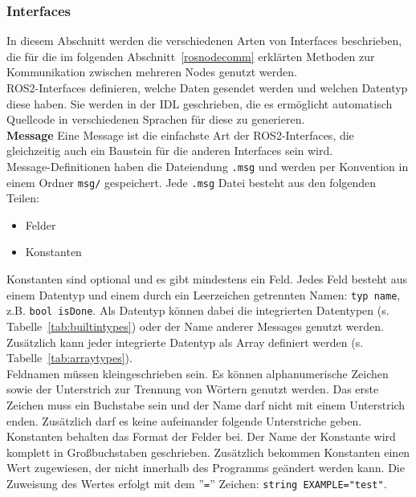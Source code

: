 \subsubsection{Interfaces}
In diesem Abschnitt werden die verschiedenen Arten von Interfaces beschrieben, die für die im folgenden Abschnitt~\ref{rosnodecomm} erklärten Methoden zur Kommunikation zwischen mehreren Nodes genutzt werden.\\
\ac{ROS2}-Interfaces definieren, welche Daten gesendet werden und welchen Datentyp diese haben.
Sie werden in der \ac{IDL} geschrieben, die es ermöglicht automatisch Quellcode in verschiedenen Sprachen für diese zu generieren.\\

\textbf{Message} Eine Message ist die einfachste Art der \ac{ROS2}-Interfaces, die gleichzeitig auch ein Baustein für die anderen Interfaces sein wird.\\
Message-Definitionen haben die Dateiendung \verb|.msg| und werden per Konvention in einem Ordner \verb|msg/| gespeichert.
Jede \verb|.msg| Datei besteht aus den folgenden Teilen:
\begin{itemize}
\item Felder
\item Konstanten
\end{itemize}
Konstanten sind optional und es gibt mindestens ein Feld.
Jedes Feld besteht aus einem Datentyp und einem durch ein Leerzeichen getrennten Namen: \verb|typ name|, z.B. \verb|bool isDone|.
Als Datentyp können dabei die integrierten Datentypen (s. Tabelle~\ref{tab:builtintypes}) oder der Name anderer Messages genutzt werden.
Zusätzlich kann jeder integrierte Datentyp als Array definiert werden (s. Tabelle~\ref{tab:arraytypes}).\\
Feldnamen müssen kleingeschrieben sein.
Es können alphanumerische Zeichen sowie der Unterstrich zur Trennung von Wörtern genutzt werden.
Das erste Zeichen muss ein Buchstabe sein und der Name darf nicht mit einem Unterstrich enden.
Zusätzlich darf es keine aufeinander folgende Unterstriche geben.\\
Konstanten behalten das Format der Felder bei.
Der Name der Konstante wird komplett in Großbuchstaben geschrieben.
Zusätzlich bekommen Konstanten einen Wert zugewiesen, der nicht innerhalb des Programms geändert werden kann.
Die Zuweisung des Wertes erfolgt mit dem ''\verb|=|'' Zeichen: \verb|string EXAMPLE="test"|.
